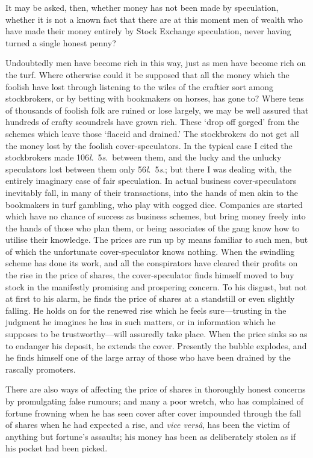 \documentclass[letterpaper,12pt,oneside,openany]{memoir}
\begin{document}
It may be asked, then, whether money has not been
made by speculation, whether it is not a known fact
that there are at this moment men of wealth who have
made their money entirely by Stock Exchange speculation,
never having turned a single honest penny?

Undoubtedly men have become rich in this way, just
as men have become rich on the turf. Where otherwise
could it be supposed that all the money which the foolish
have lost through listening to the wiles of the craftier
sort among stockbrokers, or by betting with bookmakers
on horses, has gone to? Where tens of thousands of
foolish folk are ruined or lose largely, we may be well
assured that hundreds of crafty scoundrels have grown
rich. These `drop off gorged' from the schemes which
leave those `flaccid and drained.' The stockbrokers do
not get all the money lost by the foolish cover-speculators.
In the typical case I cited the stockbrokers
made 106\textit{l}.\ 5\textit{s}.\ between them, and the lucky and the
unlucky speculators lost between them only 56\textit{l}.\ 5\textit{s}.;
but there I was dealing with, the entirely imaginary
case of fair speculation. In actual business cover-speculators
inevitably fall, in many of their transactions, into
the hands of men akin to the bookmakers in turf
gambling, who play with cogged dice. Companies
are started which have no chance of success as business
schemes, but bring money freely into the hands of those
who plan them, or being associates of the gang know
how to utilise their knowledge. The prices are run up
by means familiar to such men, but of which the unfortunate
cover-speculator knows nothing. When the
swindling scheme has done its work, and all the conspirators
have cleared their profits on the rise in the
price of shares, the cover-speculator finds himself moved
to buy stock in the manifestly promising and prospering
concern. To his disgust, but not at first to his alarm,
he finds the price of shares at a standstill or even slightly
falling. He holds on for the renewed rise which he
feels sure---trusting in the judgment he imagines he has
in such matters, or in information which he supposes to
be trustworthy---will assuredly take place. When the
price sinks so as to endanger his deposit, he extends the
cover. Presently the bubble explodes, and he finds
himself one of the large array of those who have been
drained by the rascally promoters.

There are also ways of affecting the price of shares
in thoroughly honest concerns by promulgating false
rumours; and many a poor wretch, who has complained
of fortune frowning when he has seen cover after cover
impounded through the fall of shares when he had
expected a rise, and \textit{vice vers\^a}, has been the victim of
anything but fortune's assaults; his money has been as
deliberately stolen as if his pocket had been picked.
\end{document}
